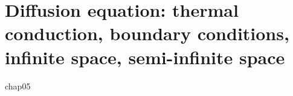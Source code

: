 \chapter{Diffusion equation: thermal conduction, boundary conditions, infinite space, semi-infinite space} 
chap05